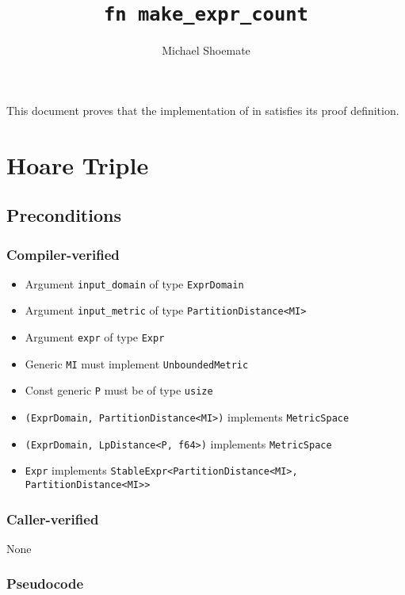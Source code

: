 \documentclass{article}
\title{\texttt{fn make\_expr\_count}}
\author{Michael Shoemate}
\begin{document}
\maketitle

This document proves that the implementation of  in  
satisfies its proof definition.

\section{Hoare Triple}
\subsection*{Preconditions}
\subsubsection*{Compiler-verified}
\begin{itemize}
    \item Argument \texttt{input\_domain} of type \texttt{ExprDomain}
    \item Argument \texttt{input\_metric} of type \texttt{PartitionDistance<MI>}
    \item Argument \texttt{expr} of type \texttt{Expr}
    \item Generic \texttt{MI} must implement \texttt{UnboundedMetric}
    \item Const generic \texttt{P} must be of type \texttt{usize}
    \item \texttt{(ExprDomain, PartitionDistance<MI>)} implements \texttt{MetricSpace}
    \item \texttt{(ExprDomain, LpDistance<P, f64>)} implements \texttt{MetricSpace}
    \item \texttt{Expr} implements \texttt{StableExpr<PartitionDistance<MI>, PartitionDistance<MI>>}
\end{itemize}

\subsubsection*{Caller-verified}
None

\subsubsection*{Pseudocode}


\end{document}
